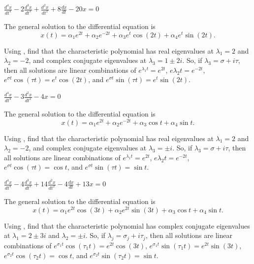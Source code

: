 \documentclass{ximera}
\begin{document}
\begin{exercise} \label{c12.2.9}
$\frac{d^4x}{dt^4}-2\frac{d^3x}{dt^3}+\frac{d^2x}{dt^2}+8\frac{dx}{dt}-20x=0$

\begin{solution}
\ans The general solution to the differential equation is
\[
x(t) = \alpha_1e^{2t} + \alpha_2e^{-2t} + \alpha_3e^t\cos(2t) +
\alpha_4e^t\sin(2t).
\]

\soln Using \Matlab, find that the characteristic polynomial has real
eigenvalues at $\lambda_1 = 2$ and $\lambda_2 = -2$, and complex
conjugate eigenvalues at $\lambda_3 = 1 \pm 2i$.  So, if $\lambda_3 =
\sigma + i\tau$, then all solutions are linear combinations of
$e^{\lambda_1 t} = e^{2t}$, $e{\lambda_2 t} = e^{-2t}$,
$e^{\sigma t}\cos(\tau t) = e^t\cos(2t)$, and
$e^{\sigma t}\sin(\tau t) = e^t\sin(2t)$.

\end{solution}
\end{exercise}
\begin{exercise} \label{c12.2.10}
$\frac{d^4x}{dt^4}-3\frac{d^2x}{dt^2}-4x=0$

\begin{solution}
\ans The general solution to the differential equation is
\[
x(t) = \alpha_1e^{2t} + \alpha_2e^{-2t} + \alpha_3\cos t +
\alpha_4\sin t.
\]

\soln Using \Matlab, find that the characteristic polynomial has real
eigenvalues at $\lambda_1 = 2$ and $\lambda_2 = -2$, and complex
conjugate eigenvalues at $\lambda_3 = \pm i$.  So, if $\lambda_3 =
\sigma + i\tau$, then all solutions are linear combinations of
$e^{\lambda_1 t} = e^{2t}$, $e{\lambda_2 t} = e^{-2t}$,
$e^{\sigma t}\cos(\tau t) = \cos t$, and $e^{\sigma t}\sin(\tau t) = \sin t$.

\end{solution}
\end{exercise}
\begin{exercise} \label{c12.2.11}
$\frac{d^4x}{dt^4}-4\frac{d^3x}{dt^3}+14\frac{d^2x}{dt^2}-4\frac{dx}{dt}+13x=0$

\begin{solution}
\ans The general solution to the differential equation is
\[
x(t) = \alpha_1e^{2t}\cos(3t) + \alpha_2e^{2t}\sin(3t) +
\alpha_3\cos t + \alpha_4\sin t.
\]

\soln Using \Matlab, find that the characteristic polynomial has complex
conjugate eigenvalues at $\lambda_1 = 2 \pm 3i$ and $\lambda_2 = \pm i$.
So, if $\lambda_j = \sigma_j + i\tau_j$, then all solutions are linear
combinations of $e^{\sigma_1 t}\cos(\tau_1 t) = e^{2t}\cos(3t)$,
$e^{\sigma_1 t}\sin(\tau_1 t) = e^{2t}\sin(3t)$,
$e^{\sigma_2 t}\cos(\tau_2 t) = \cos t$, and
$e^{\sigma_2 t}\sin(\tau_2 t) = \sin t$.





\end{solution}
\end{exercise}
\end{document}
